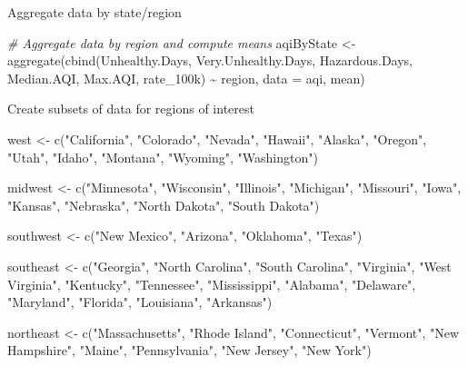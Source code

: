 \documentclass[
]{article}
\newenvironment{Shaded}{\begin{snugshade}}{\end{snugshade}}
\newcommand{\AttributeTok}[1]{\textcolor[rgb]{0.77,0.63,0.00}{#1}}
\newcommand{\CommentTok}[1]{\textcolor[rgb]{0.56,0.35,0.01}{\textit{#1}}}
\newcommand{\FunctionTok}[1]{\textcolor[rgb]{0.00,0.00,0.00}{#1}}
\newcommand{\NormalTok}[1]{#1}
\newcommand{\OtherTok}[1]{\textcolor[rgb]{0.56,0.35,0.01}{#1}}
\newcommand{\SpecialCharTok}[1]{\textcolor[rgb]{0.00,0.00,0.00}{#1}}
\newcommand{\StringTok}[1]{\textcolor[rgb]{0.31,0.60,0.02}{#1}}
\begin{document}
Aggregate data by state/region

\begin{Shaded}
\begin{Highlighting}[]
\CommentTok{\# Aggregate data by region and compute means}
\NormalTok{aqiByState }\OtherTok{\textless{}{-}} \FunctionTok{aggregate}\NormalTok{(}\FunctionTok{cbind}\NormalTok{(Unhealthy.Days, Very.Unhealthy.Days, Hazardous.Days, Median.AQI, Max.AQI, rate\_100k) }\SpecialCharTok{\textasciitilde{}}\NormalTok{ region, }\AttributeTok{data =}\NormalTok{ aqi, mean)}
\end{Highlighting}
\end{Shaded}

Create subsets of data for regions of interest

\begin{Shaded}
\begin{Highlighting}[]
\NormalTok{west }\OtherTok{\textless{}{-}} \FunctionTok{c}\NormalTok{(}\StringTok{"California"}\NormalTok{, }\StringTok{"Colorado"}\NormalTok{, }\StringTok{"Nevada"}\NormalTok{, }\StringTok{"Hawaii"}\NormalTok{, }\StringTok{"Alaska"}\NormalTok{, }\StringTok{"Oregon"}\NormalTok{, }\StringTok{"Utah"}\NormalTok{, }\StringTok{"Idaho"}\NormalTok{, }\StringTok{"Montana"}\NormalTok{, }\StringTok{"Wyoming"}\NormalTok{, }\StringTok{"Washington"}\NormalTok{)}

\NormalTok{midwest }\OtherTok{\textless{}{-}} \FunctionTok{c}\NormalTok{(}\StringTok{"Minnesota"}\NormalTok{, }\StringTok{"Wisconsin"}\NormalTok{, }\StringTok{"Illinois"}\NormalTok{, }\StringTok{"Michigan"}\NormalTok{, }\StringTok{"Missouri"}\NormalTok{, }\StringTok{"Iowa"}\NormalTok{, }\StringTok{"Kansas"}\NormalTok{, }\StringTok{"Nebraska"}\NormalTok{, }\StringTok{"North Dakota"}\NormalTok{, }\StringTok{"South Dakota"}\NormalTok{)}

\NormalTok{southwest }\OtherTok{\textless{}{-}} \FunctionTok{c}\NormalTok{(}\StringTok{"New Mexico"}\NormalTok{, }\StringTok{"Arizona"}\NormalTok{, }\StringTok{"Oklahoma"}\NormalTok{, }\StringTok{"Texas"}\NormalTok{)}

\NormalTok{southeast }\OtherTok{\textless{}{-}} \FunctionTok{c}\NormalTok{(}\StringTok{"Georgia"}\NormalTok{, }\StringTok{"North Carolina"}\NormalTok{, }\StringTok{"South Carolina"}\NormalTok{, }\StringTok{"Virginia"}\NormalTok{, }\StringTok{"West Virginia"}\NormalTok{, }\StringTok{"Kentucky"}\NormalTok{, }\StringTok{"Tennessee"}\NormalTok{, }\StringTok{"Mississippi"}\NormalTok{, }\StringTok{"Alabama"}\NormalTok{, }\StringTok{"Delaware"}\NormalTok{, }\StringTok{"Maryland"}\NormalTok{, }\StringTok{"Florida"}\NormalTok{, }\StringTok{"Louisiana"}\NormalTok{, }\StringTok{"Arkansas"}\NormalTok{)}

\NormalTok{northeast }\OtherTok{\textless{}{-}} \FunctionTok{c}\NormalTok{(}\StringTok{"Massachusetts"}\NormalTok{, }\StringTok{"Rhode Island"}\NormalTok{, }\StringTok{"Connecticut"}\NormalTok{, }\StringTok{"Vermont"}\NormalTok{, }\StringTok{"New Hampshire"}\NormalTok{, }\StringTok{"Maine"}\NormalTok{, }\StringTok{"Pennsylvania"}\NormalTok{, }\StringTok{"New Jersey"}\NormalTok{, }\StringTok{"New York"}\NormalTok{)}
\end{Highlighting}
\end{Shaded}
\end{document}
